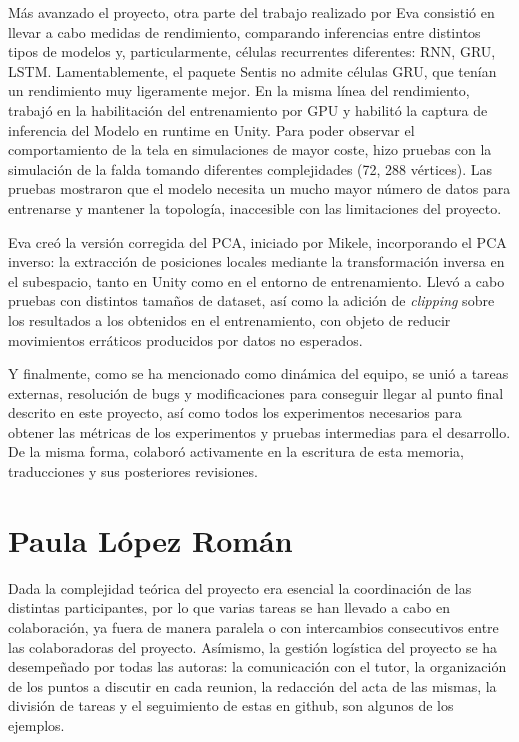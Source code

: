 Más avanzado el proyecto, otra parte del trabajo realizado por Eva consistió en llevar a cabo medidas de rendimiento, comparando inferencias entre distintos tipos de modelos y, particularmente, células recurrentes diferentes: RNN, GRU, LSTM. Lamentablemente, el paquete Sentis no admite células GRU, que tenían un rendimiento muy ligeramente mejor. En la misma línea del rendimiento, trabajó en la habilitación del entrenamiento por GPU y habilitó la captura de inferencia del Modelo en runtime en Unity.
Para poder observar el comportamiento de la tela en simulaciones de mayor coste, hizo pruebas con la simulación de la falda tomando diferentes complejidades (72, 288 vértices). Las pruebas mostraron que el modelo necesita un mucho mayor número de datos para entrenarse y mantener la topología, inaccesible con las limitaciones del proyecto. \newline

Eva creó la versión corregida del PCA, iniciado por Mikele, incorporando el PCA inverso: la extracción de posiciones locales mediante la transformación inversa en el subespacio, tanto en Unity como en el entorno de entrenamiento. Llevó a cabo pruebas con distintos tamaños de dataset, así como la adición de \textit{clipping} sobre los resultados a los obtenidos en el entrenamiento, con objeto de reducir movimientos erráticos producidos por datos no esperados. \newline

Y finalmente, como se ha mencionado como dinámica del equipo, se unió a tareas externas, resolución de bugs y modificaciones para conseguir llegar al punto final descrito en este proyecto, así como todos los experimentos necesarios para obtener las métricas de los experimentos y pruebas intermedias para el desarrollo. De la misma forma, colaboró activamente en la escritura de esta memoria, traducciones y sus posteriores revisiones.

\newpage
\section*{Paula López Román}
Dada la complejidad teórica del proyecto era esencial la coordinación de las distintas participantes, por lo que varias tareas se han llevado a cabo en colaboración, ya fuera de manera paralela o con intercambios consecutivos entre las colaboradoras del proyecto. Asímismo, la gestión logística del proyecto se ha desempeñado por todas las autoras: la comunicación con el tutor, la organización de los puntos a discutir en cada reunion, la redacción del acta de las mismas, la división de tareas y el seguimiento de estas en github, son algunos de los ejemplos. \newline

